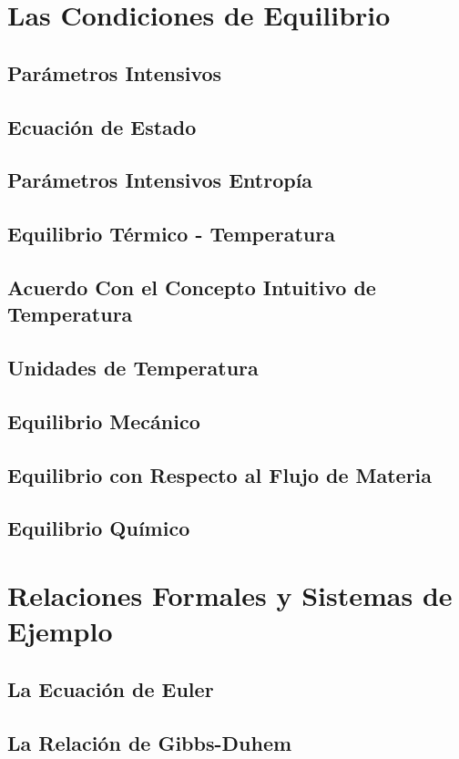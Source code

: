 \documentclass{report}
\begin{document}
\chapter{Las Condiciones de Equilibrio}
\section{Parámetros Intensivos}\label{2.1}
\section{Ecuación de Estado}\label{2.2}
\section{Parámetros Intensivos Entropía}\label{2.3}
\section{Equilibrio Térmico - Temperatura}\label{2.4}
\section{Acuerdo Con el Concepto Intuitivo de Temperatura}\label{2.5}
\section{Unidades de Temperatura}\label{2.6}
\section{Equilibrio Mecánico}\label{2.7}
\section{Equilibrio con Respecto al Flujo de Materia}\label{2.8}
\section{Equilibrio Químico}\label{2.9}
\chapter{Relaciones Formales y Sistemas de Ejemplo}
\section{La Ecuación de Euler}\label{3.1}
\section{La Relación de Gibbs-Duhem}\label{3.2}
\end{document}
